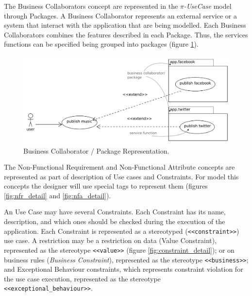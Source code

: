 The {\sc Business Collaborators} concept are represented in the
\textit{$\pi$-UseCase} model through {\sc Packages}. A {\sc Business
Collaborator} represents an external service or a system that interact
with the application that are being modelled. Each {\sc Business Collaborators}
combines the features described in each {\sc Package}. Thus, the
services functions can be specified being grouped into packages (figure
\ref{fig:businessCollaborator}).

\begin{figure}[ht!]
\centering
\includegraphics[width=.75\textwidth]{chapters/methodology/figs/businessCollaborator.pdf}
\caption{Business Collaborator / Package Representation.}
\label{fig:businessCollaborator}
\end{figure}


The {\sc Non-Functional Requirement} and {\sc Non-Functional Attribute} concepts
are represented as part of description of {\sc Use cases} and {\sc Constraints}.
For model this concepts the designer will use special tags to represent them  (figures
\ref{fig:nfr_detail} and \ref{fig:nfa_detail}).


An {\sc Use Case} may have several {\sc Constraints}. Each
{\sc Constraint} has its name, description, and which ones should be
checked during the execution of the application. Each {\sc Constraint} is
represented as a stereotyped (\texttt{<<constraint>>}) use case. A
restriction may be a restriction on data ({\sc Value Constraint}),
represented as the stereotype \texttt{<<value>>}  (figure
\ref{fig:constraint_detail}); or on business rules (\textit{Business Constraint}), represented as the stereotype
\texttt{<<business>>}; and {\sc Exceptional Behaviour} constraints, which
represents constraint violation for the use case execution, represented as the stereotype
\texttt{<<exceptional\_behaviour>>}. 

